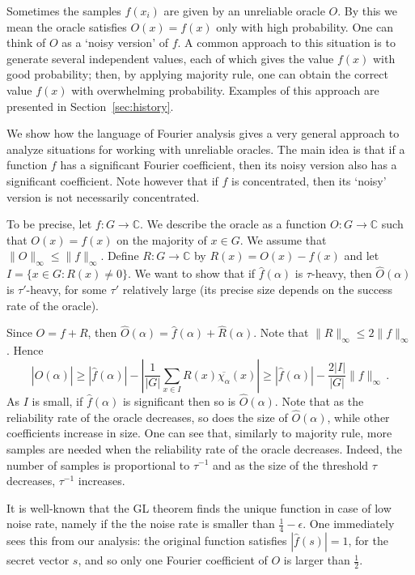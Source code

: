 \documentclass[11pt]{article}
\theoremstyle{definition}
\newcommand{\C}{\mathbb{C}}
\begin{document}
Sometimes the samples $f(x_i)$ are given by an unreliable oracle $O$. By this we mean the oracle satisfies $O(x) = f(x)$ only with high probability. One can think of $O$ as a `noisy version' of $f$.
A common approach to this situation is to generate several independent values, each of which gives the value $f(x)$ with good probability; then, by applying majority rule, one can obtain the correct value $f(x)$ with overwhelming probability. Examples of this approach are presented in Section~\ref{sec:history}.

We show how the language of Fourier analysis gives a very general approach to analyze situations for working with unreliable oracles. The main idea is that if a function $f$ has a significant Fourier coefficient, then its noisy version also has a significant coefficient.
Note however that if $f$ is concentrated, then its `noisy' version is not necessarily concentrated.

To be precise, let $f : G \to \C$. We describe the oracle as a function $O : G \to \C$ such that $O(x) = f(x)$ on the majority of $x \in G$. We assume that $\| O \|_\infty \leq \| f \|_\infty$. Define $R : G \to \C$ by $R(x) = O(x) - f(x)$ and let $I = \{ x \in G : R(x) \ne 0 \}$. We want to show that if $\widehat{f}(\alpha)$ is $\tau$-heavy, then $\widehat{O}(\alpha)$ is $\tau'$-heavy, for some $\tau'$ relatively large (its precise size depends on the success rate of the oracle).

Since $O=f+R$, then $\widehat{O}(\alpha) = \widehat{f}(\alpha) + \widehat{R}(\alpha)$.
Note that $\|R\|_\infty \leq 2\|f\|_\infty$.
Hence
\[ \left|\widehat{O}(\alpha)\right| \geq \left|\widehat{f}(\alpha)\right| - \left|\frac{1}{|G|} \sum_{x \in I}R(x) \overline{\chi_\alpha}(x)\right| \geq \left|\widehat{f}(\alpha)\right| - \frac{2|I|}{|G|} \|f\|_\infty \,.\]
As $I$ is small, if $\widehat{f}(\alpha)$ is significant then so is $\widehat{O}(\alpha)$. Note that as the reliability rate of the oracle decreases, so does the size of $\widehat{O}(\alpha)$, while other coefficients increase in size. One can see that, similarly to majority rule, more samples are needed when the reliability rate of the oracle decreases. Indeed, the number of samples is proportional to $\tau^{-1}$ and as the size of the threshold $\tau$ decreases, $\tau^{-1}$ increases.

It is well-known that the GL theorem finds the unique function in case of low noise rate, namely if the the noise rate is smaller than $\frac{1}{4}-\epsilon$. One immediately sees this from our analysis:
the original function satisfies $|\widehat{f}(s)|=1$, for the secret vector $s$, and so only one Fourier coefficient of $O$ is larger than $\frac{1}{2}$.
\end{document}
